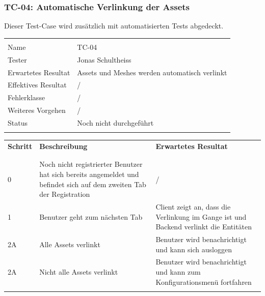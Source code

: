 \subsubsection{TC-04: Automatische Verlinkung der Assets}
Dieser Test-Case wird zusätzlich mit automatisierten Tests abgedeckt.
\begin{table}[H]
  \begin{tabularx}{\textwidth}{l X}\hline \\
  Name & TC-04 \\
  Tester & Jonas Schultheiss \\
  Erwartetes Resultat & Assets und Meshes werden automatisch verlinkt \\
  Effektives Resultat & / \\
  Fehlerklasse & / \\
  Weiteres Vorgehen & / \\
  Status & Noch nicht durchgeführt \\
  \\\hline
  \end{tabularx}
\end{table}
\begin{table}[H]
  \begin{tabularx}{\textwidth}{l X X}
  \textbf{Schritt} & \textbf{Beschreibung} & \textbf{Erwartetes Resultat}\\ \\\hline \\
  0 & Noch nicht registrierter Benutzer hat sich bereits angemeldet und befindet sich auf dem zweiten Tab der Registration & / \\
  1 & Benutzer geht zum nächsten Tab & Client zeigt an, dass die Verlinkung im Gange ist und Backend verlinkt die Entitäten \\
  2A & Alle Assets verlinkt & Benutzer wird benachrichtigt und kann sich ausloggen \\
  2A & Nicht alle Assets verlinkt & Benutzer wird benachrichtigt und kann zum Konfigurationsmenü fortfahren \\
  \\\hline
  \end{tabularx}
\end{table}
\pagebreak
